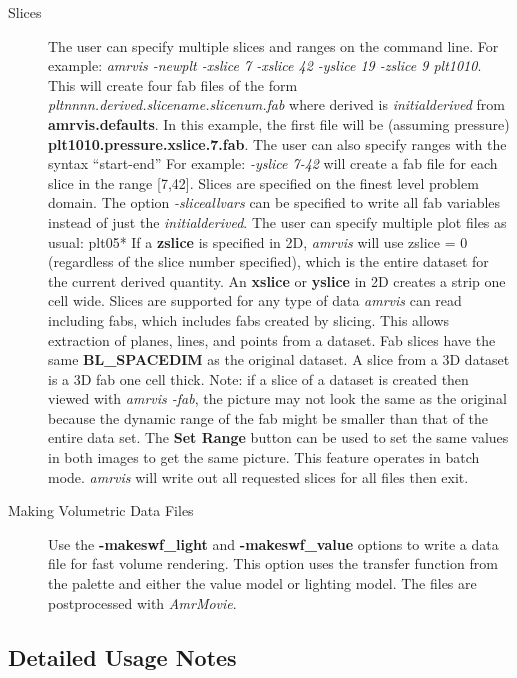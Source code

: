 \begin{description}
\item [Slices] The user can specify multiple slices and ranges on the command line.
For example:
{\em amrvis -newplt -xslice 7 -xslice 42 -yslice 19 -zslice 9 plt1010}.
This will create four fab files of the form
{\em pltnnnn.derived.slicename.slicenum.fab}
where derived is {\em initialderived} from {\bf amrvis.defaults}.
In this example, the
first file will be (assuming pressure) {\bf plt1010.pressure.xslice.7.fab}.
The user can also specify ranges with the syntax ``start-end''  For example:
{\em -yslice 7-42} will create a fab file for each slice in the range [7,42].
Slices are specified on the finest level problem domain.
The option {\em -sliceallvars} can be specified to write all fab variables
instead of just the {\em initialderived}.
The user can specify multiple plot files as usual:  plt05*
If a {\bf zslice} is specified in 2D, {\em amrvis} will use
zslice = 0 (regardless of the
slice number specified), which is the entire dataset for the current
derived quantity.  An {\bf xslice} or {\bf yslice} in 2D creates
a strip one cell wide.
Slices are supported for any type of data {\em amrvis} can read
including fabs, which includes fabs created by slicing.  This allows
extraction of planes, lines, and points from a dataset.
Fab slices have the same {\bf BL\_SPACEDIM} as the original dataset.  A slice from
a 3D dataset is a 3D fab one cell thick.
Note:  if a slice of a dataset is created then viewed with {\em amrvis -fab},
the picture may not look the same as the original
because the dynamic range of the fab might be smaller than that of
the entire data set.  The {\bf Set Range} button can be used to set
the same values in both images to get the same picture.
This feature operates in batch mode.
{\em amrvis} will write out all requested slices for all files then exit.

\item [Making Volumetric Data Files]  Use the {\bf -makeswf\_light}
and {\bf -makeswf\_value} options to write a data file for fast volume
rendering.  This option uses the transfer function from the palette and either the
value model or lighting model.  The files are postprocessed with
{\em AmrMovie}.

\end{description}



\subsection{Detailed Usage Notes}

